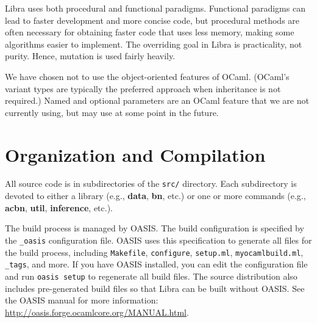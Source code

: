 \documentclass[11pt]{article}
\begin{document}
Libra uses both procedural and functional paradigms.  Functional
paradigms can lead to faster development and more concise code, but
procedural methods are often necessary for obtaining faster code that
uses less memory, making some algorithms easier to implement.  The
overriding goal in Libra is practicality, not purity.  Hence, mutation
is used fairly heavily.

We have chosen not to use the object-oriented features of OCaml.
(OCaml's variant types are typically the preferred approach when
inheritance is not required.)  Named and optional parameters are an
OCaml feature that we are not currently using, but may use at some
point in the future.

\section{Organization and Compilation}

All source code is in subdirectories of the {\tt src/} directory.
Each subdirectory is devoted to either a library (e.g., {\bf data},
{\bf bn}, etc.) or one or more commands (e.g., {\bf acbn}, {\bf util},
{\bf inference}, etc.).

The build process is managed by OASIS.  The build
configuration is specified by the {\tt \_oasis} configuration file.
OASIS uses this specification to generate all files for the build
process, including {\tt Makefile}, {\tt configure}, {\tt setup.ml},
{\tt myocamlbuild.ml}, {\tt \_tags}, and more.  If you have OASIS
installed, you can edit the configuration file and run {\tt oasis
setup} to regenerate all build files.  The source distribution also
includes pre-generated build files so that Libra can be built without
OASIS.  See the OASIS manual for more information:
\url{http://oasis.forge.ocamlcore.org/MANUAL.html}.
\end{document}
